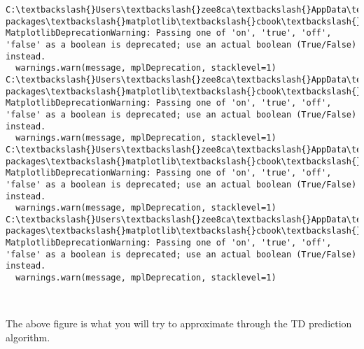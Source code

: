 \documentclass[11pt]{article}
\begin{document}
    \begin{Verbatim}[commandchars=\\\{\}]
C:\textbackslash{}Users\textbackslash{}zee8ca\textbackslash{}AppData\textbackslash{}Local\textbackslash{}Continuum\textbackslash{}anaconda3\textbackslash{}lib\textbackslash{}site-packages\textbackslash{}matplotlib\textbackslash{}cbook\textbackslash{}deprecation.py:107: MatplotlibDeprecationWarning: Passing one of 'on', 'true', 'off', 'false' as a boolean is deprecated; use an actual boolean (True/False) instead.
  warnings.warn(message, mplDeprecation, stacklevel=1)
C:\textbackslash{}Users\textbackslash{}zee8ca\textbackslash{}AppData\textbackslash{}Local\textbackslash{}Continuum\textbackslash{}anaconda3\textbackslash{}lib\textbackslash{}site-packages\textbackslash{}matplotlib\textbackslash{}cbook\textbackslash{}deprecation.py:107: MatplotlibDeprecationWarning: Passing one of 'on', 'true', 'off', 'false' as a boolean is deprecated; use an actual boolean (True/False) instead.
  warnings.warn(message, mplDeprecation, stacklevel=1)
C:\textbackslash{}Users\textbackslash{}zee8ca\textbackslash{}AppData\textbackslash{}Local\textbackslash{}Continuum\textbackslash{}anaconda3\textbackslash{}lib\textbackslash{}site-packages\textbackslash{}matplotlib\textbackslash{}cbook\textbackslash{}deprecation.py:107: MatplotlibDeprecationWarning: Passing one of 'on', 'true', 'off', 'false' as a boolean is deprecated; use an actual boolean (True/False) instead.
  warnings.warn(message, mplDeprecation, stacklevel=1)
C:\textbackslash{}Users\textbackslash{}zee8ca\textbackslash{}AppData\textbackslash{}Local\textbackslash{}Continuum\textbackslash{}anaconda3\textbackslash{}lib\textbackslash{}site-packages\textbackslash{}matplotlib\textbackslash{}cbook\textbackslash{}deprecation.py:107: MatplotlibDeprecationWarning: Passing one of 'on', 'true', 'off', 'false' as a boolean is deprecated; use an actual boolean (True/False) instead.
  warnings.warn(message, mplDeprecation, stacklevel=1)

    \end{Verbatim}

    \begin{center}
    \end{center}
    { \hspace*{\fill} \\}
    
    The above figure is what you will try to approximate through the TD
prediction algorithm.
\end{document}
